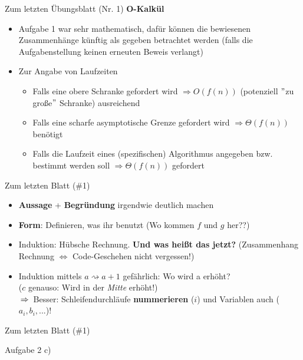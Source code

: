 \begin{frame}{Zum letzten Übungsblatt (Nr. 1)}
	\textbf{O-Kalkül} \\[0,25cm]
	\begin{itemize}
		\item Aufgabe 1 war sehr mathematisch, dafür können die bewiesenen Zusammenhänge künftig als gegeben betrachtet werden (falls die Aufgabenstellung keinen erneuten Beweis verlangt)
		\item Zur Angabe von Laufzeiten
		\begin{itemize}
			\item Falls eine obere Schranke gefordert wird $\Rightarrow O(f(n))$ (potenziell $"$zu große$"$ Schranke) ausreichend
			\item Falls eine scharfe asymptotische Grenze gefordert wird $\Rightarrow \Theta(f(n))$ benötigt
			\item Falls die Laufzeit eines (spezifischen) Algorithmus angegeben bzw. bestimmt werden soll $\Rightarrow \Theta(f(n))$ gefordert
		\end{itemize}
	\end{itemize}
\end{frame}



\begin{frame}{Zum letzten Blatt (\#1)} %
	\begin{itemize}
		\item \textbf{Aussage} + \textbf{Begründung} irgendwie deutlich machen
		\item \textbf{Form}: Definieren, was ihr benutzt (Wo kommen $f$ und $g$ her??)
		\pause
		\item Induktion: Hübsche Rechnung. \textbf{Und was heißt das jetzt?} (Zusammenhang Rechnung $\Leftrightarrow$ Code-Geschehen nicht vergessen!)
		\item Induktion mittels $a \rightsquigarrow a + 1$ gefährlich: Wo wird a erhöht? \\ ($c$ genauso: Wird in der \textit{Mitte} erhöht!) \\
		$\impl$ Besser: Schleifendurchläufe \textbf{nummerieren} ($i$) und Variablen auch ($a_i, b_i,...$)!
	\end{itemize} 
\end{frame}

\begin{frame}{Zum letzten Blatt (\#1)}
	\begin{exampleblock}{Aufgabe 2 c)}
		\begin{algorithm}[H]
		\end{algorithm}
	\end{exampleblock}
\end{frame}

